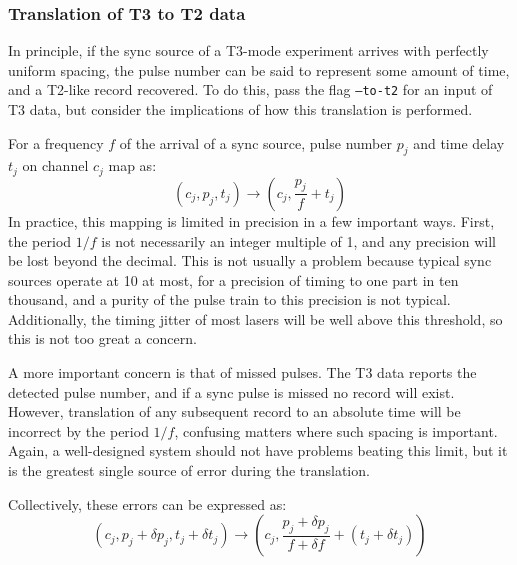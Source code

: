 \documentclass{article}
\begin{document}
\subsubsection{Translation of T3 to T2 data}
In principle, if the sync source of a T3-mode experiment arrives with perfectly uniform spacing, the pulse number can be said to represent some amount of time, and a T2-like record recovered. To do this, pass the flag \texttt{--to-t2} for an input of T3 data, but consider the implications of how this translation is performed. 

For a frequency $f$ of the arrival of a sync source, pulse number $p_{j}$ and time delay $t_{j}$ on channel $c_{j}$ map as:
\begin{equation}
\left(c_{j}, p_{j}, t_{j}\right) \rightarrow \left(c_{j}, \frac{p_{j}}{f} + t_{j}\right)
\end{equation}
In practice, this mapping is limited in precision in a few important ways. First, the period $1/f$ is not necessarily an integer multiple of 1\pico\second, and any precision will be lost beyond the decimal. This is not usually a problem because typical sync sources operate at 10\mega\hertz{} at most, for a precision of timing to one part in ten thousand, and a purity of the pulse train to this precision is not typical. Additionally, the timing jitter of most lasers will be well above this threshold, so this is not too great a concern.

A more important concern is that of missed pulses. The T3 data reports the detected pulse number, and if a sync pulse is missed no record will exist. However, translation of any subsequent record to an absolute time will be incorrect by the period $1/f$, confusing matters where such spacing is important. Again, a well-designed system should not have problems beating this limit, but it is the greatest single source of error during the translation.

Collectively, these errors can be expressed as:
\begin{equation}
\left(c_{j}, p_{j}+\delta p_{j}, t_{j} + \delta t_{j}\right) \rightarrow \left(c_{j}, \frac{p_{j}+\delta p_{j}}{f+\delta f} + \left(t_{j}+\delta t_{j}\right)\right)
\end{equation}
\end{document}
